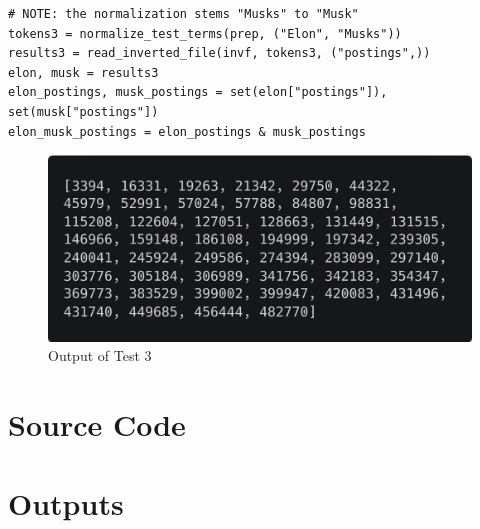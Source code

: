 \documentclass[11pt]{article}
\begin{document}
\begin{lstlisting}[style=mypython,caption=Test 3: docids for documents that have both "Elon" and "Musk"]
# NOTE: the normalization stems "Musks" to "Musk"
tokens3 = normalize_test_terms(prep, ("Elon", "Musks"))
results3 = read_inverted_file(invf, tokens3, ("postings",))
elon, musk = results3
elon_postings, musk_postings = set(elon["postings"]), set(musk["postings"])
elon_musk_postings = elon_postings & musk_postings
\end{lstlisting}

\begin{figure}[!ht]
    \centering
    \includegraphics[scale=0.15]{statics/test3.png}
    \caption{Output of Test 3}
\end{figure}

\appendix

\section{Source Code} \label{appendix:src}



\section{Outputs} \label{appendix:outputs}


\end{document}
